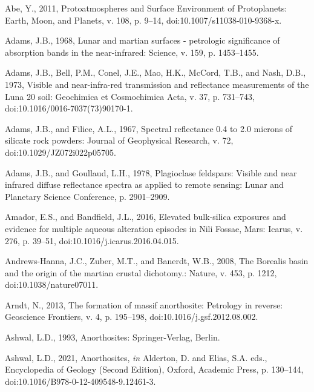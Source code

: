 \documentclass[11pt]{article}
\begin{document}
\begin{thebibliography}{99}

 Abe, Y., 2011, Protoatmospheres and Surface Environment of Protoplanets: Earth, Moon, and Planets, v. 108, p. 9--14, doi:10.1007/s11038-010-9368-x.

 Adams, J.B., 1968, Lunar and martian surfaces - petrologic significance of absorption bands in the near-infrared: Science, v. 159, p. 1453--1455.

 Adams, J.B., Bell, P.M., Conel, J.E., Mao, H.K., McCord, T.B., and Nash, D.B., 1973, Visible and near-infra-red transmission and reflectance measurements of the Luna 20 soil: Geochimica et Cosmochimica Acta, v. 37, p. 731--743, doi:10.1016/0016-7037(73)90170-1.

 Adams, J.B., and Filice, A.L., 1967, Spectral reflectance 0.4 to 2.0 microns of silicate rock powders: Journal of Geophysical Research, v. 72, doi:10.1029/JZ072i022p05705.

 Adams, J.B., and Goullaud, L.H., 1978, Plagioclase feldspars: Visible and near infrared diffuse reflectance spectra as applied to remote sensing: Lunar and Planetary Science Conference, p. 2901--2909.

 Amador, E.S., and Bandfield, J.L., 2016, Elevated bulk-silica exposures and evidence for multiple aqueous alteration episodes in Nili Fossae, Mars: Icarus, v. 276, p. 39--51, doi:10.1016/j.icarus.2016.04.015.

 Andrews-Hanna, J.C., Zuber, M.T., and Banerdt, W.B., 2008, The Borealis basin and the origin of the martian crustal dichotomy.: Nature, v. 453, p. 1212, doi:10.1038/nature07011.

 Arndt, N., 2013, The formation of massif anorthosite: Petrology in reverse: Geoscience Frontiers, v. 4, p. 195--198, doi:10.1016/j.gsf.2012.08.002.

 Ashwal, L.D., 1993, Anorthosites: Springer-Verlag, Berlin.

 Ashwal, L.D., 2021, Anorthosites, \textit{in} Alderton, D. and Elias, S.A. eds., Encyclopedia of Geology (Second Edition), Oxford, Academic Press, p. 130--144, doi:10.1016/B978-0-12-409548-9.12461-3.


\end{thebibliography}
\end{document}

